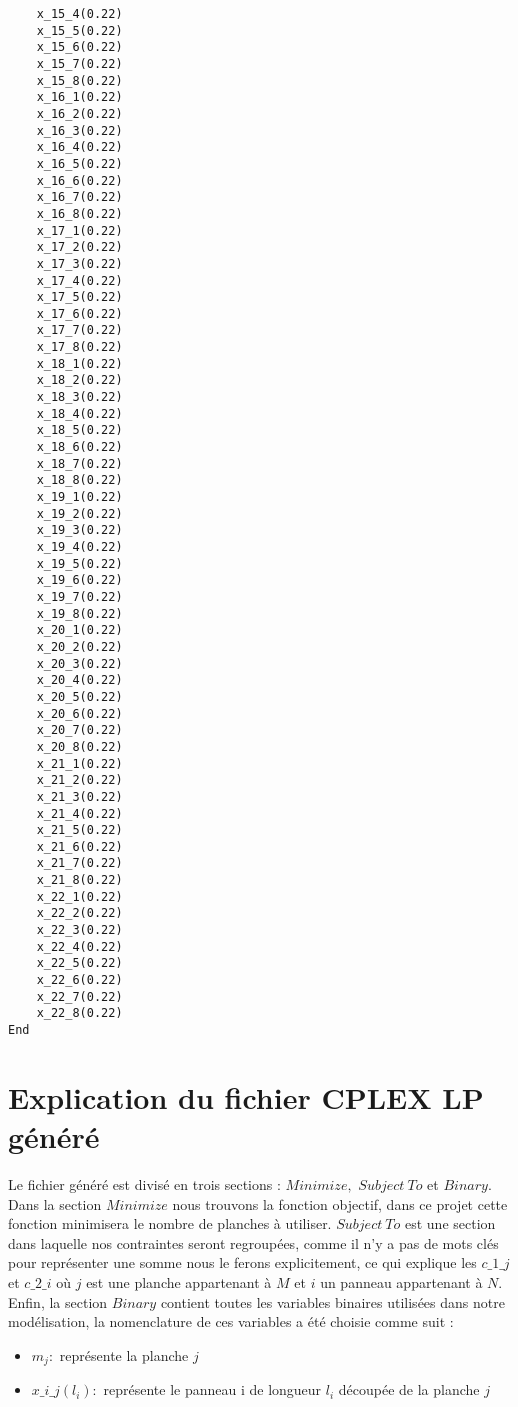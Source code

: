 \documentclass{article}[A4]
\begin{document}
\begin{lstlisting}
	x_15_4(0.22)
	x_15_5(0.22)
	x_15_6(0.22)
	x_15_7(0.22)
	x_15_8(0.22)
	x_16_1(0.22)
	x_16_2(0.22)
	x_16_3(0.22)
	x_16_4(0.22)
	x_16_5(0.22)
	x_16_6(0.22)
	x_16_7(0.22)
	x_16_8(0.22)
	x_17_1(0.22)
	x_17_2(0.22)
	x_17_3(0.22)
	x_17_4(0.22)
	x_17_5(0.22)
	x_17_6(0.22)
	x_17_7(0.22)
	x_17_8(0.22)
	x_18_1(0.22)
	x_18_2(0.22)
	x_18_3(0.22)
	x_18_4(0.22)
	x_18_5(0.22)
	x_18_6(0.22)
	x_18_7(0.22)
	x_18_8(0.22)
	x_19_1(0.22)
	x_19_2(0.22)
	x_19_3(0.22)
	x_19_4(0.22)
	x_19_5(0.22)
	x_19_6(0.22)
	x_19_7(0.22)
	x_19_8(0.22)
	x_20_1(0.22)
	x_20_2(0.22)
	x_20_3(0.22)
	x_20_4(0.22)
	x_20_5(0.22)
	x_20_6(0.22)
	x_20_7(0.22)
	x_20_8(0.22)
	x_21_1(0.22)
	x_21_2(0.22)
	x_21_3(0.22)
	x_21_4(0.22)
	x_21_5(0.22)
	x_21_6(0.22)
	x_21_7(0.22)
	x_21_8(0.22)
	x_22_1(0.22)
	x_22_2(0.22)
	x_22_3(0.22)
	x_22_4(0.22)
	x_22_5(0.22)
	x_22_6(0.22)
	x_22_7(0.22)
	x_22_8(0.22)
End
\end{lstlisting}
\section{Explication du fichier CPLEX LP généré} 
Le fichier généré est divisé en trois sections : $Minimize,$ $Subject\ To$
et $Binary$. Dans la section $Minimize$ nous trouvons la fonction 
objectif, dans ce projet cette fonction minimisera le nombre de 
planches à utiliser. $Subject\ To$ est une section dans laquelle nos 
contraintes seront regroupées, comme il n'y a pas de mots clés pour 
représenter une somme nous le ferons explicitement, ce qui explique 
les \texttt{$c\_1\_j$} et \texttt{$c\_2\_i$} où $j$ est une planche 
appartenant à $M$ et $i$ un panneau appartenant à $N$. Enfin, la 
section $Binary$ contient toutes les variables binaires utilisées dans 
notre modélisation, la nomenclature de ces variables a été choisie 
comme suit : 

\begin{itemize}
	\item[] $m_j:$ représente la planche $j$
	\item[] \texttt{$x\_i\_j(l_i):$} représente le panneau i de longueur 
	$l_i$ découpée de la planche $j$
\end{itemize}  
\end{document}
